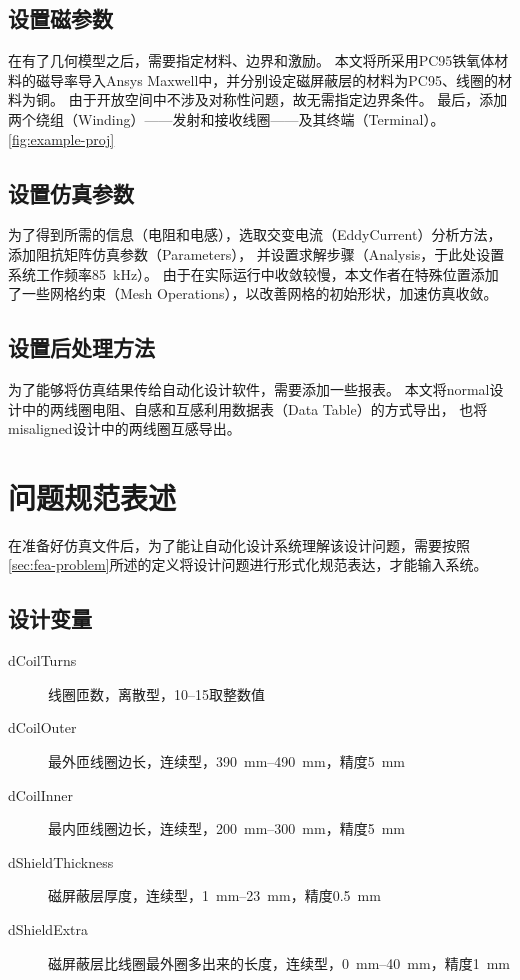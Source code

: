 \documentclass[index]{subfiles}
\begin{document}
\subsection{设置磁参数}
在有了几何模型之后，需要指定材料、边界和激励。
本文将所采用PC95铁氧体材料的磁导率导入Ansys Maxwell中，并分别设定磁屏蔽层的材料为PC95、线圈的材料为铜。
由于开放空间中不涉及对称性问题，故无需指定边界条件。
最后，添加两个绕组（Winding）——发射和接收线圈——及其终端（Terminal）。
\cref{fig:example-proj}

\subsection{设置仿真参数}
为了得到所需的信息（电阻和电感），选取交变电流（EddyCurrent）分析方法，添加阻抗矩阵仿真参数（Parameters），
并设置求解步骤（Analysis，于此处设置系统工作频率\SI{85}{\kilo\hertz}）。
由于在实际运行中收敛较慢，本文作者在特殊位置添加了一些网格约束（Mesh Operations），以改善网格的初始形状，加速仿真收敛。

\subsection{设置后处理方法}
为了能够将仿真结果传给自动化设计软件，需要添加一些报表。
本文将normal设计中的两线圈电阻、自感和互感利用数据表（Data Table）的方式导出，
也将misaligned设计中的两线圈互感导出。

\section{问题规范表述}
在准备好仿真文件后，为了能让自动化设计系统理解该设计问题，需要按照\cref{sec:fea-problem}所述的定义将设计问题进行形式化规范表达，才能输入系统。

\subsection{设计变量}
\begin{description}
  \item[dCoilTurns] 线圈匝数，离散型，\numrange{10}{15}取整数值
  \item[dCoilOuter] 最外匝线圈边长，连续型，\SIrange{390}{490}{\milli\metre}，精度\SI{5}{\milli\metre}
  \item[dCoilInner] 最内匝线圈边长，连续型，\SIrange{200}{300}{\milli\metre}，精度\SI{5}{\milli\metre}
  \item[dShieldThickness] 磁屏蔽层厚度，连续型，\SIrange{1}{23}{\milli\metre}，精度\SI{0.5}{\milli\metre}
  \item[dShieldExtra] 磁屏蔽层比线圈最外圈多出来的长度，连续型，\SIrange{0}{40}{\milli\metre}，精度\SI{1}{\milli\metre}
\end{description}
\end{document}
